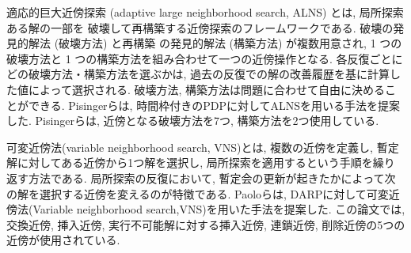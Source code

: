 適応的巨大近傍探索 (adaptive large neighborhood search, ALNS) とは, 局所探索ある解の一部を 破壊して再構築する近傍探索のフレームワークである\cite{ALNS}. 破壊の発見的解法 (破壊方法) と再構築 の発見的解法 (構築方法) が複数用意され, 1 つの破壊方法と 1 つの構築方法を組み合わせて一つの近傍操作となる. 各反復ごとにどの破壊方法・構築方法を選ぶかは, 過去の反復での解の改善履歴を基に計算した値によって選択される. 破壊方法, 構築方法は問題に合わせて自由に決めることができる.
Pisingerらは, 時間枠付きのPDPに対してALNSを用いる手法を提案した\cite{pisinger}. Pisingerらは, 近傍となる破壊方法を7つ, 構築方法を2つ使用している.

可変近傍法(variable neighborhood search, VNS)とは, 複数の近傍を定義し, 暫定解に対してある近傍から1つ解を選択し, 局所探索を適用するという手順を繰り返す方法である. 局所探索の反復において, 暫定会の更新が起きたかによって次の解を選択する近傍を変えるのが特徴である. Paoloらは, DARPに対して可変近傍法(Variable neighborhood search,VNS)を用いた手法を提案した\cite{VNS}. この論文では, 交換近傍, 挿入近傍, 実行不可能解に対する挿入近傍, 連鎖近傍, 削除近傍の5つの近傍が使用されている.
